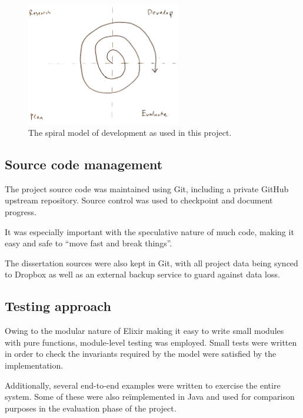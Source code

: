 \begin{figure}[h]
	\centering
	\includegraphics[width=0.6\textwidth]{images/temp/spiral}
	\caption{The spiral model of development as used in this project.}
	\label{fig:prep:spiral-model}
\end{figure}



\subsection{Source code management}

The project source code was maintained using Git, including a private GitHub upstream repository.
Source control was used to checkpoint and document progress.

It was especially important with the speculative nature of much code, making it easy and safe to ``move fast and break things''.

The dissertation sources were also kept in Git, with all project data being synced to Dropbox as well as an external backup service to guard against data loss.

\subsection{Testing approach}

Owing to the modular nature of Elixir making it easy to write small modules with pure functions, module-level testing was employed.
Small tests were written in order to check the invariants required by the model were satisfied by the implementation.


Additionally, several end-to-end examples were written to exercise the entire system.
Some of these were also re\"implemented in Java and used for comparison purposes in the evaluation phase of the project.

